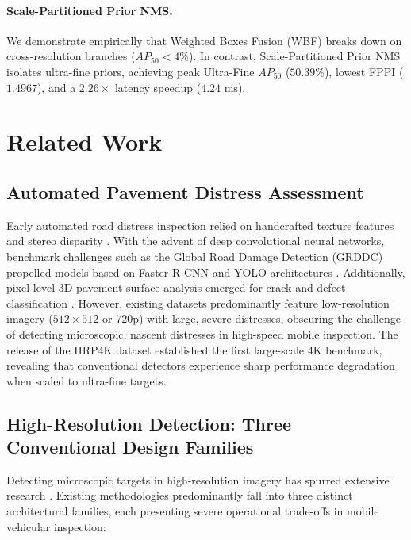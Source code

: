 \documentclass[runningheads]{llncs}
\begin{document}
\paragraph{Scale-Partitioned Prior NMS.} We demonstrate empirically that Weighted Boxes Fusion (WBF) breaks down on cross-resolution branches ($AP_{50} < 4\%$). In contrast, Scale-Partitioned Prior NMS isolates ultra-fine priors, achieving peak Ultra-Fine $AP_{50}$ ($50.39\%$), lowest FPPI ($1.4967$), and a $2.26\times$ latency speedup ($4.24\text{ ms}$).

\section{Related Work}

\subsection{Automated Pavement Distress Assessment}
Early automated road distress inspection relied on handcrafted texture features and stereo disparity \cite{koch2011pothole,cord2012automatic,fan2019pothole}. With the advent of deep convolutional neural networks, benchmark challenges such as the Global Road Damage Detection (GRDDC) \cite{maeda2018road,arya2021deep} propelled models based on Faster R-CNN \cite{ren2015faster} and YOLO architectures \cite{redmon2018yolov3,bochkovskiy2020yolov4,ge2021yolox,wang2023yolov7,ultralytics2024yolo11}. Additionally, pixel-level 3D pavement surface analysis emerged for crack and defect classification \cite{zhang2017automated,coenen2021computer}. However, existing datasets predominantly feature low-resolution imagery ($512 \times 512$ or $720\text{p}$) with large, severe distresses, obscuring the challenge of detecting microscopic, nascent distresses in high-speed mobile inspection. The release of the HRP4K dataset \cite{hrp4k_dataset} established the first large-scale 4K benchmark, revealing that conventional detectors experience sharp performance degradation when scaled to ultra-fine targets.

\subsection{High-Resolution Detection: Three Conventional Design Families}
Detecting microscopic targets in high-resolution imagery has spurred extensive research \cite{yang2019clustered,wang2021high}. Existing methodologies predominantly fall into three distinct architectural families, each presenting severe operational trade-offs in mobile vehicular inspection:
\end{document}
